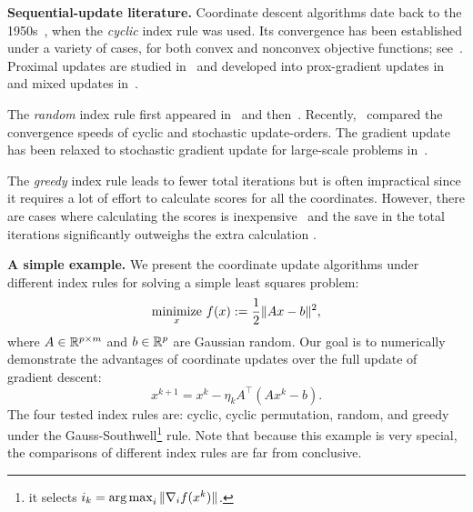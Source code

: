 
\textbf{Sequential-update literature.} Coordinate descent algorithms date back to the 1950s~\cite{hildreth1957quadprog}, when the \emph{cyclic} index rule was used. Its convergence has been established under a variety of cases, for both convex and nonconvex objective functions; see~\cite{Warga-63,zadeh1970note, Sargent-Sebastian-73,Han-88,luo1992convergence, Tseng-93, Grippo-Sciandrone-00, Tseng-01, razaviyayn2013unified, beck2013convergence, hong2015iteration, wright2015coordinate}. Proximal updates are studied in~\cite{Grippo-Sciandrone-00, attouch2010proximal} and developed into prox-gradient updates in~\cite{tseng2009_CGD, tseng2009block-linear, bolte2014proximal} and mixed updates in~\cite{XY_2013_multiblock}.

The \emph{random} index rule first appeared in~\cite{nesterov2012cd} and then~\cite{richtarik2014iteration, Lu_Xiao_rbcd_2015}. Recently,~\cite{XY_2014_ecd,Xu2015_APG_NTD} compared the convergence speeds of cyclic and stochastic update-orders. The gradient update has been relaxed to  stochastic gradient update for large-scale problems in~\cite{DangLan-SBMD, XY_2015_bsg}.

The \emph{greedy} index rule leads to fewer total iterations but is often impractical since it requires a lot of effort to calculate  scores for all the coordinates. However, there are cases where calculating the scores is inexpensive~\cite{bertsekas1999nonlinear, li2009gcoord, wu2008coordinate} and the save in the total iterations significantly outweighs the extra calculation \cite{tseng2009_CGD, dhillon2011nearest, PYY_2013_GRock, schmidt2014coordinate}.

\textbf{A simple example.} We present the coordinate update algorithms under different index rules for solving a simple least squares problem:  %
$$\operatorname*{minimize}_{x}\, f(x):= \frac{1}{2} \|A x - b\|^2,$$
where $A \in \mathbb{R}^{p \times m}$ and $b \in \mathbb{R}^p$ are Gaussian random. Our goal is to numerically demonstrate the advantages of coordinate updates over the  full update of  gradient descent:
$$x^{k+1} = x^k - \eta_k A^{\top}(A x^k - b).$$
The four tested index rules are: cyclic, cyclic permutation, random, and greedy under the Gauss-Southwell\footnote{it selects $i_k=\operatorname*{arg\,max}_i\|\nabla_if(x^k)\|$.} rule.
Note that because this example is very special, the comparisons of different index rules are far from conclusive.

